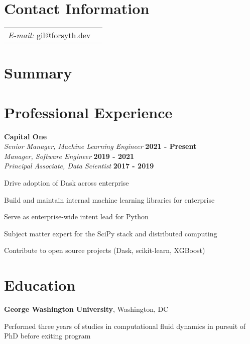 \documentclass[margin,line]{res}
\newenvironment{list1}{
  \begin{list}{\ding{113}}{%
      \setlength{\itemsep}{0in}
      \setlength{\parsep}{0in} \setlength{\parskip}{0in}
      \setlength{\topsep}{0in} \setlength{\partopsep}{0in}
      \setlength{\leftmargin}{0.17in}}}{\end{list}}
\begin{document}
\newcommand{\link}[1]{\texttt{#1}}
\providecommand{\tightlist}{%
      \setlength{\itemsep}{0pt}\setlength{\parskip}{0pt}}



\begin{resume}
\section{\sc Contact Information}
\vspace{.05in}
\begin{tabular}{@{}p{2in}p{4in}}
{\it E-mail:}  gil@forsyth.dev
\end{tabular}


\section{\sc Summary}


\section{\sc Professional Experience}

{\bf Capital One } \\
{\em Senior Manager, Machine Learning Engineer } \hfill {\bf 2021 - Present}\\
{\em Manager, Software Engineer } \hfill {\bf 2019 - 2021}\\
{\em Principal Associate, Data Scientist } \hfill {\bf 2017 - 2019}\\
\vspace*{-.1in}
\begin{list1}
\item[] Drive adoption of Dask across enterprise
\item[] Build and maintain internal machine learning libraries for enterprise
\item[] Serve as enterprise-wide intent lead for Python
\item[] Subject matter expert for the SciPy stack and distributed computing
\item[] Contribute to open source projects (Dask, scikit-learn, XGBoost)
\end{list1}

\section{\sc Education}
{\bf George Washington University}, Washington, DC\\
\vspace*{-.1in}
\begin{list1}
\item[] Performed three years of studies in computational fluid dynamics in pursuit of PhD before exiting program
\end{list1}


\end{resume}
\end{document}
